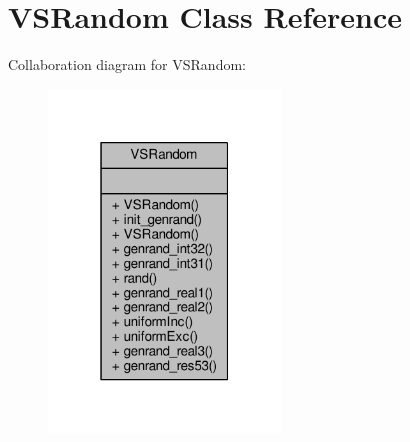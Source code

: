 \hypertarget{classVSRandom}{}\section{V\+S\+Random Class Reference}
\label{classVSRandom}


Collaboration diagram for V\+S\+Random\+:
\nopagebreak
\begin{figure}[H]
\begin{center}
\leavevmode
\includegraphics[width=175pt]{d1/dd3/classVSRandom__coll__graph}
\end{center}
\end{figure}
